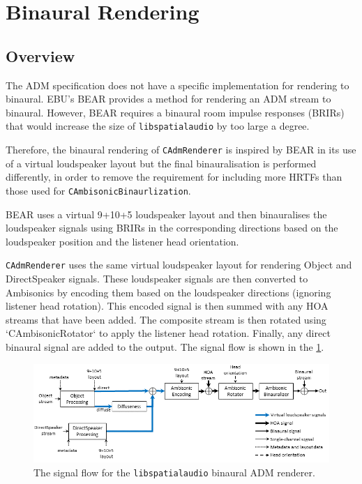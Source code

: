 \documentclass[12pt]{report}
\def\libspataud{\texttt{libspatialaudio}\xspace}
\newcommand{\code}[1]{\texttt{#1}}
\begin{document}
\section{Binaural Rendering}\label{AdmBinaural}

\subsection{Overview}

The ADM specification does not have a specific implementation for rendering to binaural. EBU's BEAR \cite{EBU3369} provides a method for rendering an ADM stream to binaural.
However, BEAR requires a  binaural room impulse responses (BRIRs) that would increase the size of \libspataud by too large a degree.

Therefore, the binaural rendering of \code{CAdmRenderer} is inspired by BEAR in its use of a virtual loudspeaker layout but the final binauralisation is performed differently, in order to remove the requirement for including more HRTFs than those used for \code{CAmbisonicBinaurlization}.

BEAR uses a virtual 9+10+5 loudspeaker layout and then binauralises the loudspeaker signals using BRIRs in the corresponding directions based on the loudspeaker position and the listener head orientation.

\code{CAdmRenderer} uses the same virtual loudspeaker layout for rendering Object and DirectSpeaker signals.
These loudspeaker signals are then converted to Ambisonics by encoding them based on the loudspeaker directions (ignoring listener head rotation).
This encoded signal is then summed with any HOA streams that have been added.
The composite stream is then rotated using `CAmbisonicRotator` to apply the listener head rotation.
Finally, any direct binaural signal are added to the output.
The signal flow is shown in the \cref{fig:adm_binaural}.

\begin{figure}
    \centering
    \includegraphics[width = \textwidth]{figures/AdmBinauralSignalFlow.png}
    \caption{The signal flow for the \libspataud binaural ADM renderer.}
    \label{fig:adm_binaural}
\end{figure}
\end{document}

